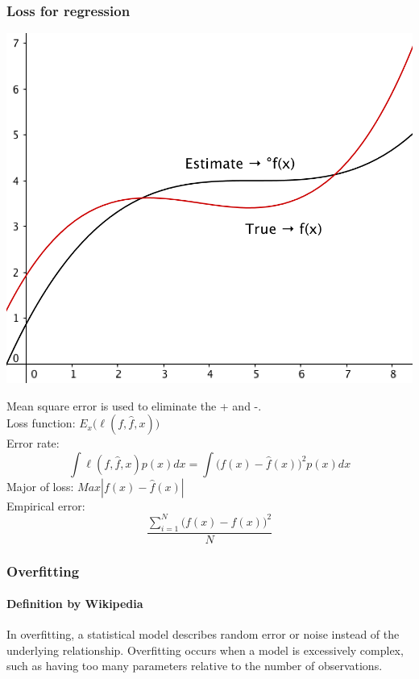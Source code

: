 \documentclass{article}
\begin{document}
{{{        \subsubsection{Loss for regression}{
            \begin{center}{
                \includegraphics[scale=0.5]{loss-regression.png}
            }
            \end{center}
             Mean square error is used to eliminate the + and -.\\
             Loss function: \(E_x\big(\ell(f,\hat{f},x)\big)\)\\
             Error rate: \[\int\ell(f,\hat{f},x)p(x)dx=\int\big(f(x)-\hat{f}(x)\big)^2p(x)dx\]
             Major of loss: \(Max{|f(x)-\hat{f}(x)|}\)\\
             Empirical error: \[\frac{\sum_{i=1}^{N}\big(f(x)-\hat{f}(x)\big)^2}{N}\]
        }
        \subsubsection{Overfitting}{    
            \paragraph{Definition by Wikipedia}{
                In overfitting, a statistical model describes random error or noise instead of the underlying relationship. Overfitting occurs when a model is excessively complex, such as having too many parameters relative to the number of observations.
            }

}}}}
\end{document}
